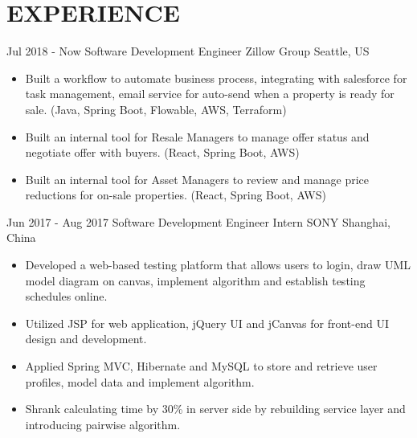 
\section{EXPERIENCE}

{\customcventry
{Jul 2018 - Now}
{Software Development Engineer}
{Zillow Group}
{Seattle, US}
{}
{
    \begin{itemize}
        \item Built a workflow to automate business process, integrating with salesforce for task management, email service for auto-send when a property is ready for sale. (Java, Spring Boot, Flowable, AWS, Terraform) 
        \item Built an internal tool for Resale Managers to manage offer status and negotiate offer with buyers. (React, Spring Boot, AWS)
        \item Built an internal tool for Asset Managers to review and manage price reductions for on-sale properties. (React, Spring Boot, AWS)
    \end{itemize}
}   
}

{\customcventry
{Jun 2017 - Aug 2017}
{Software Development Engineer Intern}
{SONY}
{Shanghai, China}
{}
{
    \begin{itemize}
        \item Developed a web-based testing platform that allows users to login, draw UML model diagram on canvas, implement algorithm and establish testing schedules online.
        \item Utilized JSP for web application, jQuery UI and jCanvas for front-end UI design and development.
        \item Applied Spring MVC, Hibernate and MySQL to store and retrieve user profiles, model data and implement algorithm.
        \item Shrank calculating time by 30\% in server side by rebuilding service layer and introducing pairwise algorithm.
    \end{itemize}
}   
}